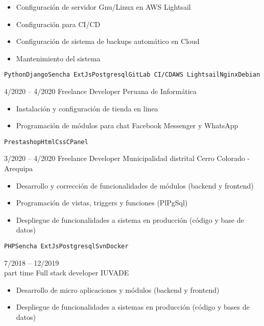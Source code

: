\begin{entrylist}
{\begin{itemize}
    	        \item Configuración de servidor Gnu/Linux en AWS Lightsail
    	        \item Configuración para CI/CD
    	        \item Configuración de sistema de backups automático en Cloud
    	        \item Mantenimiento del sistema
    	    \end{itemize}
		    \texttt{Python}\slashsep\texttt{Django}\slashsep\texttt{Sencha ExtJs}\slashsep\texttt{Postgresql}\slashsep\texttt{GitLab CI/CD}\slashsep\texttt{AWS Lightsail}\slashsep\texttt{Nginx}\slashsep\texttt{Debian}
        }
	\entry
		{4/2020 -- 4/2020}
		{Freelance Developer}
		{Peruana de Informática}
		{
		    \vspace{-5mm}
    	    \begin{itemize}
    	        \setlength\itemsep{0pt}
    	        \item Instalación y configuración de tienda en linea
    	        \item Programación de módulos para chat Facebook Messenger y WhatsApp
    	    \end{itemize}
		    \texttt{Prestashop}\slashsep\texttt{Html}\slashsep\texttt{Css}\slashsep\texttt{CPanel}
        }
	\entry
		{3/2020 -- 4/2020}
		{Freelance Developer}
		{Municipalidad distrital Cerro Colorado - Arequipa}
		{
		    \vspace{-5mm}
    	    \begin{itemize}
    	        \setlength\itemsep{0pt}
    	        \item Desarrollo y corrección de funcionalidades de módulos (backend y frontend)
    	        \item Programación de vistas, triggers y funciones (PlPgSql)
    	        \item Despliegue de funcionalidades a sistema en producción (código y base de datos)
    	    \end{itemize}
		    \texttt{PHP}\slashsep\texttt{Sencha ExtJs}\slashsep\texttt{Postgresql}\slashsep\texttt{Svn}\slashsep\texttt{Docker}
        }
	\entry
		{7/2018 -- 12/2019\\\footnotesize{part time}}
		{Full stack developer}
		{IUVADE}
		{
		    \vspace{-5mm}
    	    \begin{itemize}
    	        \setlength\itemsep{0pt}
    	        \item Desarrollo de micro aplicaciones y módulos (backend y frontend)
    	        \item Despliegue de funcionalidades a sistemas en producción (código y bases de datos)

\end{itemize}}
\end{entrylist}
